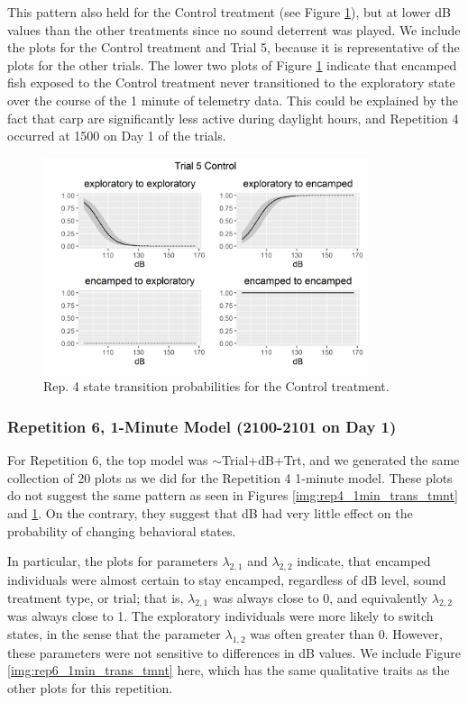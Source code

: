 \documentclass[12pt]{article}
\begin{document}
			This pattern also held for the Control treatment (see Figure \ref{img:rep4_1min_trans_control}), but at lower dB values than the other treatments since no sound deterrent was played. We include the plots for the Control treatment and Trial 5, because it is representative of the plots for the other trials. The lower two plots of Figure \ref{img:rep4_1min_trans_control} indicate that encamped fish exposed to the Control treatment never transitioned to the exploratory state over the course of the 1 minute of telemetry data. This could be explained by the fact that carp are significantly less active during daylight hours, and Repetition 4 occurred at 1500 on Day 1 of the trials.
			
			\begin{figure}
				\centering
				\includegraphics[width=0.85\textwidth]{trans_rep_4_trial_5_Control.png}
				\caption{Rep. 4 state transition probabilities for the Control treatment.}
				\label{img:rep4_1min_trans_control}
			\end{figure}
			
		\subsubsection{Repetition 6, 1-Minute Model (2100-2101 on Day 1)}
		
			For Repetition 6, the top model was $\sim$Trial+dB+Trt, and we generated the same collection of 20 plots as we did for the Repetition 4 1-minute model. These plots do not suggest the same pattern as seen in Figures \ref{img:rep4_1min_trans_tmnt} and \ref{img:rep4_1min_trans_control}. On the contrary, they suggest that dB had very little effect on the probability of changing behavioral states. 
			
			In particular, the plots for parameters $\lambda_{2, 1}$ and $\lambda_{2, 2}$ indicate, that encamped individuals were almost certain to stay encamped, regardless of dB level, sound treatment type, or trial; that is, $\lambda_{2, 1}$ was always close to 0, and equivalently $\lambda_{2, 2}$ was always close to 1. The exploratory individuals were more likely to switch states, in the sense that the parameter $\lambda_{1, 2}$ was often greater than 0. However, these parameters were not sensitive to differences in dB values. We include Figure \ref{img:rep6_1min_trans_tmnt} here, which has the same qualitative traits as the other plots for this repetition.
			
\end{document}
